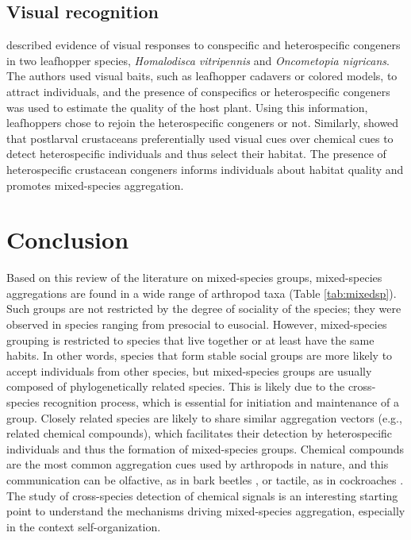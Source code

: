 		\subsection{Visual recognition}
\citet{mizell_iii_congener_2012} described evidence of visual responses to conspecific and heterospecific congeners in two leafhopper species, \textit{Homalodisca vitripennis} and \textit{Oncometopia nigricans}. The authors used visual baits, such as leafhopper cadavers or colored models, to attract individuals, and the presence of conspecifics or heterospecific congeners was used to estimate the quality of the host plant. Using this information, leafhoppers chose to rejoin the heterospecific congeners or not. Similarly, \citet{lecchini_ecological_2010} showed that postlarval crustaceans preferentially used visual cues over chemical cues to detect heterospecific individuals and thus select their habitat. The presence of heterospecific crustacean congeners informs individuals about habitat quality and promotes mixed-species aggregation.


	\section{Conclusion}  
Based on this review of the literature on mixed-species groups, mixed-species aggregations are found in a wide range of arthropod taxa (Table \ref{tab:mixedsp}). Such groups are not restricted by the degree of sociality of the species; they were observed in species ranging from presocial to eusocial. However, mixed-species grouping is restricted to species that live together or at least have the same habits. In other words, species that form stable social groups are more likely to accept individuals from other species, but mixed-species groups are usually composed of phylogenetically related species. This is likely due to the cross-species recognition process, which is essential for initiation and maintenance of a group. Closely related species are likely to share similar aggregation vectors (e.g., related chemical compounds), which facilitates their detection by heterospecific individuals and thus the formation of mixed-species groups. Chemical compounds are the most common aggregation cues used by arthropods in nature, and this communication can be olfactive, as in bark beetles \cite{wertheim_evolutionary_2005}, or tactile, as in cockroaches \cite{everaerts_changes_1997}. The study of cross-species detection of chemical signals is an interesting starting point to understand the mechanisms driving mixed-species aggregation, especially in the context self-organization. 

